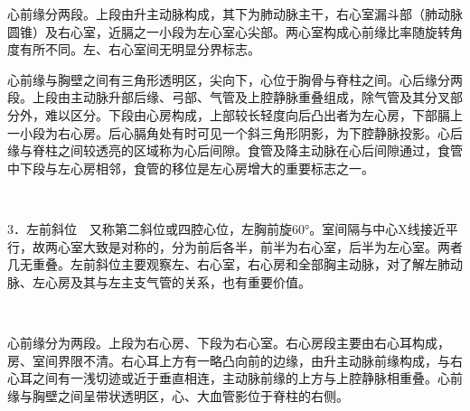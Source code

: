心前缘分两段。上段由升主动脉构成，其下为肺动脉主干，右心室漏斗部（肺动脉圆锥）及右心室，近膈之一小段为左心室心尖部。两心室构成心前缘比率随旋转角度有所不同。左、右心室间无明显分界标志。

心前缘与胸壁之间有三角形透明区，尖向下，心位于胸骨与脊柱之间。心后缘分两段。上段由主动脉升部后缘、弓部、气管及上腔静脉重叠组成，除气管及其分叉部分外，难以区分。下段由心房构成，上部较长轻度向后凸出者为左心房，下部膈上一小段为右心房。后心膈角处有时可见一个斜三角形阴影，为下腔静脉投影。心后缘与脊柱之间较透亮的区域称为心后间隙。食管及降主动脉在心后间隙通过，食管中下段与左心房相邻，食管的移位是左心房增大的重要标志之一。

\begin{figure}
  \centering
{}
\\
\caption{}
\label{fig4-1-2}
\end{figure}

3．左前斜位　又称第二斜位或四腔心位，左胸前旋60°。室间隔与中心X线接近平行，故两心室大致是对称的，分为前后各半，前半为右心室，后半为左心室。两者几无重叠。左前斜位主要观察左、右心室，右心房和全部胸主动脉，对了解左肺动脉、左心房及其与左主支气管的关系，也有重要价值。

\begin{figure}
  \centering
{}
\\
\caption{}
\label{fig4-1-3}
\end{figure}

心前缘分为两段。上段为右心房、下段为右心室。右心房段主要由右心耳构成，房、室间界限不清。右心耳上方有一略凸向前的边缘，由升主动脉前缘构成，与右心耳之间有一浅切迹或近于垂直相连，主动脉前缘的上方与上腔静脉相重叠。心前缘与胸壁之间呈带状透明区，心、大血管影位于脊柱的右侧。

